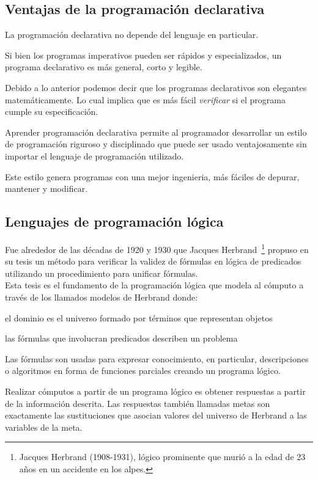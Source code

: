 \documentclass[11pt,letterpaper]{article}
\begin{document}
\subsection{Ventajas de la programación declarativa}

La programación declarativa no depende del lenguaje en particular. 
\bi
 \item Si bien los programas imperativos pueden ser rápidos y especializados, un programa declarativo es más general, corto y legible. 
 \item Debido a lo anterior podemos decir que los programas declarativos son 
elegantes matemáticamente. Lo cual implica que es más fácil \textit{verificar} 
si el programa cumple su especificación.
 \item Aprender programación declarativa permite al programador desarrollar un 
estilo de programación riguroso y disciplinado  que puede ser usado 
ventajosamente sin importar el lenguaje de programación utilizado.
 \item Este estilo genera programas con una mejor ingenieria, más f\'aciles de 
depurar, mantener y modificar.
\ei


\subsection{Lenguajes de programación lógica}

Fue alrededor de las d\'ecadas de 1920 y 1930 que Jacques 
Herbrand~\footnote{Jacques Herbrand (1908-1931), l\'ogico prominente que 
muri\'o a la edad de 23 años en un accidente en los alpes.} propuso en 
su tesis un m\'etodo para verificar la validez de f\'ormulas en l\'ogica de 
predicados utilizando un procedimiento para unificar f\'ormulas. \\
Esta tesis es el fundamento de la programaci\'on l\'ogica que modela al 
c\'omputo a trav\'es de los llamados modelos de Herbrand donde:
\be
\item el dominio es el universo formado por t\'erminos que representan objetos
\item las f\'ormulas que involucran predicados describen un problema
\ee

Las f\'ormulas son usadas para expresar conocimiento, en particular, 
descripciones o algoritmos en forma de funciones parciales creando un programa 
l\'ogico.

Realizar c\'omputos a partir de un programa l\'ogico es obtener respuestas a 
partir de la informaci\'on descrita. 
Las respuestas tambi\'en llamadas metas son exactamente las sustituciones que 
asocian valores del universo de Herbrand a las variables de la meta.
\end{document}
